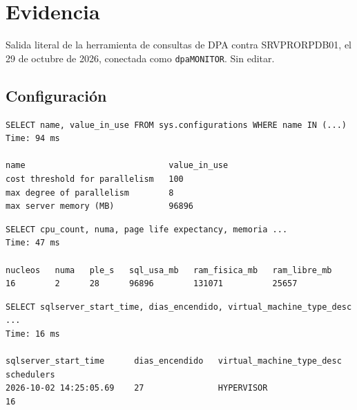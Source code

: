 \documentclass[11pt,a4paper]{article}
\newcommand{\cod}[1]{\texttt{\small #1}}
\begin{document}
\newpage
\section{Evidencia}

Salida literal de la herramienta de consultas de DPA contra SRVPRORPDB01,
el 29 de octubre de 2026, conectada como \cod{dpaMONITOR}. Sin editar.

\subsection{Configuración}

\begin{lstlisting}[style=salida]
SELECT name, value_in_use FROM sys.configurations WHERE name IN (...)
Time: 94 ms

name                             value_in_use
cost threshold for parallelism   100
max degree of parallelism        8
max server memory (MB)           96896
\end{lstlisting}

\begin{lstlisting}[style=salida]
SELECT cpu_count, numa, page life expectancy, memoria ...
Time: 47 ms

nucleos   numa   ple_s   sql_usa_mb   ram_fisica_mb   ram_libre_mb
16        2      28      96896        131071          25657
\end{lstlisting}

\begin{lstlisting}[style=salida]
SELECT sqlserver_start_time, dias_encendido, virtual_machine_type_desc ...
Time: 16 ms

sqlserver_start_time      dias_encendido   virtual_machine_type_desc   schedulers
2026-10-02 14:25:05.69    27               HYPERVISOR                  16
\end{lstlisting}
\end{document}
